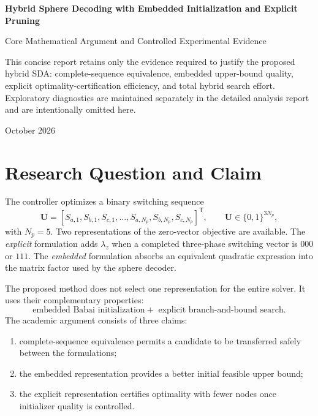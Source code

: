 \documentclass[paper=a4,oneside,fontsize=12pt,DIV=14,headings=normal,parskip=half,headsepline,numbers=noendperiod]{scrreprt}
\newcommand{\vct}[1]{\bm{#1}}
\newcommand{\T}{\mathsf{T}}
\begin{document}
\begin{titlepage}
\centering\vspace*{3cm}
{\sffamily\bfseries\fontsize{23}{28}\selectfont
Hybrid Sphere Decoding with Embedded Initialization and Explicit Pruning\par}
\vspace{0.6cm}
{\sffamily\fontsize{16}{20}\selectfont
Core Mathematical Argument and Controlled Experimental Evidence\par}
\vfill
\begin{minipage}{0.84\textwidth}\small
This concise report retains only the evidence required to justify the proposed
hybrid SDA: complete-sequence equivalence, embedded upper-bound quality,
explicit optimality-certification efficiency, and total hybrid search effort.
Exploratory diagnostics are maintained separately in the detailed analysis
report and are intentionally omitted here.
\end{minipage}
\vfill{\large October 2026\par}
\end{titlepage}
\tableofcontents\clearpage{}

\chapter{Research Question and Claim}

The controller optimizes a binary switching sequence
\begin{equation}
 \vct U=[S_{a,1},S_{b,1},S_{c,1},\ldots,S_{a,N_p},S_{b,N_p},S_{c,N_p}]^\T,
 \qquad \vct U\in\{0,1\}^{3N_p},
\end{equation}
with $N_p=5$.  Two representations of the zero-vector objective are available.
The \emph{explicit} formulation adds $\lambda_z$ when a completed three-phase
switching vector is $000$ or $111$.  The \emph{embedded} formulation absorbs
an equivalent quadratic expression into the matrix factor used by the sphere
decoder.

The proposed method does not select one representation for the entire solver.
It uses their complementary properties:
\begin{equation}
 \boxed{\text{embedded Babai initialization}
 +\text{ explicit branch-and-bound search}.}
\end{equation}
The academic argument consists of three claims:
\begin{enumerate}
 \item complete-sequence equivalence permits a candidate to be transferred
 safely between the formulations;
 \item the embedded representation provides a better initial feasible upper
 bound;
 \item the explicit representation certifies optimality with fewer nodes once
 initializer quality is controlled.
\end{enumerate}
\end{document}
